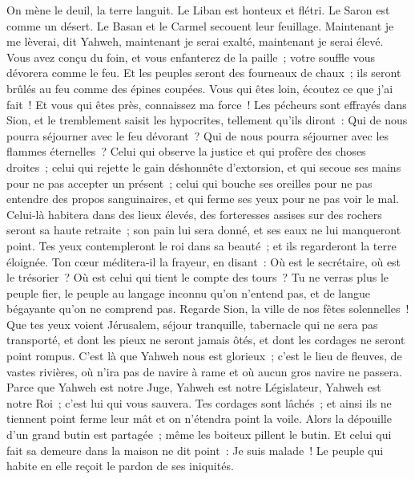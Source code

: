 \begin{multicols}{2}
On mène le deuil, la terre languit. Le Liban est honteux et flétri. Le Saron est comme un désert. Le Basan et le Carmel secouent leur feuillage.
Maintenant je me lèverai, dit Yahweh, maintenant je serai exalté, maintenant je serai élevé.
Vous avez conçu du foin, et vous enfanterez de la paille~; votre souffle vous dévorera comme le feu.
Et les peuples seront des fourneaux de chaux~; ils seront brûlés au feu comme des épines coupées.
Vous qui êtes loin, écoutez ce que j'ai fait~! Et vous qui êtes près, connaissez ma force~!
Les pécheurs sont effrayés dans Sion, et le tremblement saisit les hypocrites, tellement qu'ils diront~: Qui de nous pourra séjourner avec le feu dévorant~? Qui de nous pourra séjourner avec les flammes éternelles~?
Celui qui observe la justice et qui profère des choses droites~; celui qui rejette le gain déshonnête d'extorsion, et qui secoue ses mains pour ne pas accepter un présent~; celui qui bouche ses oreilles pour ne pas entendre des propos sanguinaires, et qui ferme ses yeux pour ne pas voir le mal.
Celui-là habitera dans des lieux élevés, des forteresses assises sur des rochers seront sa haute retraite~; son pain lui sera donné, et ses eaux ne lui manqueront point.
Tes yeux contempleront le roi dans sa beauté~; et ils regarderont la terre éloignée.
Ton cœur méditera-il la frayeur, en disant~: Où est le secrétaire, où est le trésorier~? Où est celui qui tient le compte des tours~?
Tu ne verras plus le peuple fier, le peuple au langage inconnu qu'on n'entend pas, et de langue bégayante qu'on ne comprend pas.
Regarde Sion, la ville de nos fêtes solennelles~! Que tes yeux voient Jérusalem, séjour tranquille, tabernacle qui ne sera pas transporté, et dont les pieux ne seront jamais ôtés, et dont les cordages ne seront point rompus.
C'est là que Yahweh nous est glorieux~; c'est le lieu de fleuves, de vastes rivières, où n'ira pas de navire à rame et où aucun gros navire ne passera.
Parce que Yahweh est notre Juge, Yahweh est notre Législateur, Yahweh est notre Roi~; c'est lui qui vous sauvera.
Tes cordages sont lâchés~; et ainsi ils ne tiennent point ferme leur mât et on n'étendra point la voile. Alors la dépouille d'un grand butin est partagée~; même les boiteux pillent le butin.
Et celui qui fait sa demeure dans la maison ne dit point~: Je suis malade~! Le peuple qui habite en elle reçoit le pardon de ses iniquités.

\end{multicols}
